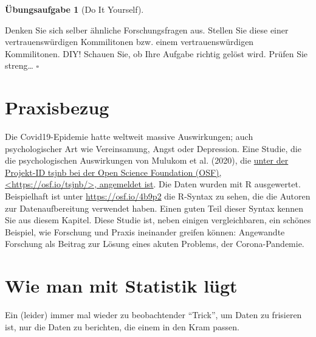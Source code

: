 \documentclass[
  letterpaper,
  oneside,
  open=any]{scrbook}
\theoremstyle{definition}
\newtheorem{exercise}{Übungsaufgabe}[chapter]
\theoremstyle{definition}
\theoremstyle{definition}
\theoremstyle{remark}
\begin{document}
\begin{exercise}[Do It
Yourself]\protect\hypertarget{exr-diy}{}\label{exr-diy}

Denken Sie sich selber ähnliche Forschungsfragen aus. Stellen Sie diese
einer vertrauenswürdigen Kommilitonen bzw. einem vertrauenswürdigen
Kommilitonen. DIY! Schauen Sie, ob Ihre Aufgabe richtig gelöst wird.
Prüfen Sie streng\ldots{} \(\square\)

\end{exercise}

\section{Praxisbezug}\label{praxisbezug-2}

Die Covid19-Epidemie hatte weltweit massive Auswirkungen; auch
psychologischer Art wie Vereinsamung, Angst oder Depression. Eine
Studie, die die psychologischen Auswirkungen von Mulukom et al. (2020),
die \href{https://osf.io/tsjnb/}{unter der Projekt-ID tsjnb bei der Open
Science Foundation (OSF), \textless https://osf.io/tsjnb/\textgreater,
angemeldet ist}. Die Daten wurden mit R ausgewertet. Beispielhaft ist
unter \url{https://osf.io/4b9p2} die R-Syntax zu sehen, die die Autoren
zur Datenaufbereitung verwendet haben. Einen guten Teil dieser Syntax
kennen Sie aus diesem Kapitel. Diese Studie ist, neben einigen
vergleichbaren, ein schönes Beispiel, wie Forschung und Praxis
ineinander greifen können: Angewandte Forschung als Beitrag zur Lösung
eines akuten Problems, der Corona-Pandemie.

\section{Wie man mit Statistik
lügt}\label{wie-man-mit-statistik-luxfcgt-1}

Ein (leider) immer mal wieder zu beobachtender \enquote{Trick}, um Daten
zu frisieren ist, nur die Daten zu berichten, die einem in den Kram
passen.
\end{document}

